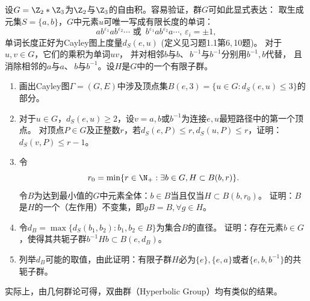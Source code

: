 \begin{10}
    设$G=\Z_2*\Z_3$为$\Z_2$与$\Z_3$的自由积。容易验证，群$G$可如此显式表达：
    取生成元集$S=\{a,b\}$，$G$中元素$u$可唯一写成有限长度的单词：
    \[ab^{\varepsilon_1}ab^{\varepsilon_2}\cdots\text{ 或 }\,
    b^{\varepsilon_1}ab^{\varepsilon_2}a\cdots,\,\varepsilon_i=\pm1,\]
    单词长度正好为Cayley图上度量$d_S(e,u)$ (定义见习题1.1第6,\,10题)。
    对于$u,v \in G$，它们的乘积为单词$uv$，
    并对相邻$b$与$b$、\,$b^{-1}$与$b^{-1}$分别用$b^{-1},b$代替，
    且消除相邻的$a$与$a$、\,$b$与$b^{-1}$。设$H$是$G$中的一个有限子群。
    \begin{enumerate}[label=(\roman*)]
    \item 画出Cayley图$\varGamma=(G,E)$中涉及顶点集$B(e,3)=\{u \in G:d_S(e,u)\leqslant3\}$的部分。
    \item 对于$u \in G$，$d_S(e,u)\geqslant2$，设$v=a,b$或$b^{-1}$为连接$e,u$最短路径中的第一个顶点。
    对顶点$P \in G$及正整数$r$，若$d_S(e,P) \leqslant r,d_S(u,P) \leqslant r$，证明：$d_S(v,P) \leqslant r-1$。
    \item 令
    \[r_0=\min\{r\in\N_+:\exists b \in G,H \subset B(b,r)\}.\]
    令$B$为达到最小值的$G$中元素全体：$b \in B$当且仅当$H \subset B(b,r_0)$。
    证明：$B$是$H$的一个（左作用）不变集，即$gB=B,\forall g \in H$。
    \item 令$d_B=\max\{d_S(b_1,b_2):b_1,b_2 \in B\}$为集合$B$的直径。
    证明：存在元素$b \in G$，使得其共轭子群$b^{-1}Hb \subset B(e,d_B)$。
    \item 列举$d_B$可能的取值，由此证明：有限子群$H$必为$\{e\},\{e,a\}$或者$\{e,b,b^{-1}\}$的共轭子群。
    \end{enumerate}
    实际上，由几何群论可得，双曲群（Hyperbolic Group）均有类似的结果。
\end{10}
